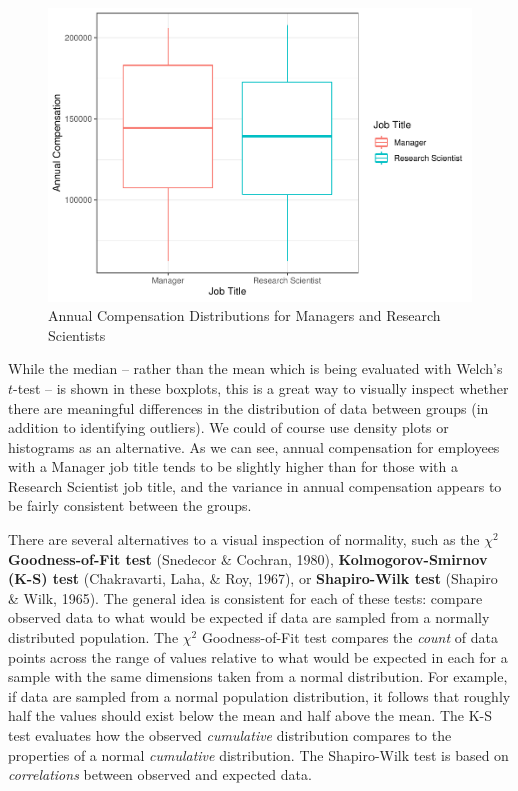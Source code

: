 \documentclass[
]{book}
\begin{document}
\begin{figure}

{\centering \includegraphics[width=1\linewidth]{People_Analytics_Lifecycle_files/figure-latex/comp-job-boxplots-1} 

}

\caption{Annual Compensation Distributions for Managers and Research Scientists}\label{fig:comp-job-boxplots}
\end{figure}

While the median -- rather than the mean which is being evaluated with Welch's \(t\)-test -- is shown in these boxplots, this is a great way to visually inspect whether there are meaningful differences in the distribution of data between groups (in addition to identifying outliers). We could of course use density plots or histograms as an alternative. As we can see, annual compensation for employees with a Manager job title tends to be slightly higher than for those with a Research Scientist job title, and the variance in annual compensation appears to be fairly consistent between the groups.

There are several alternatives to a visual inspection of normality, such as the \({\chi}^2\) \textbf{Goodness-of-Fit test} (Snedecor \& Cochran, 1980), \textbf{Kolmogorov-Smirnov (K-S) test} (Chakravarti, Laha, \& Roy, 1967), or \textbf{Shapiro-Wilk test} (Shapiro \& Wilk, 1965). The general idea is consistent for each of these tests: compare observed data to what would be expected if data are sampled from a normally distributed population. The \({\chi}^2\) Goodness-of-Fit test compares the \emph{count} of data points across the range of values relative to what would be expected in each for a sample with the same dimensions taken from a normal distribution. For example, if data are sampled from a normal population distribution, it follows that roughly half the values should exist below the mean and half above the mean. The K-S test evaluates how the observed \emph{cumulative} distribution compares to the properties of a normal \emph{cumulative} distribution. The Shapiro-Wilk test is based on \emph{correlations} between observed and expected data.
\end{document}
